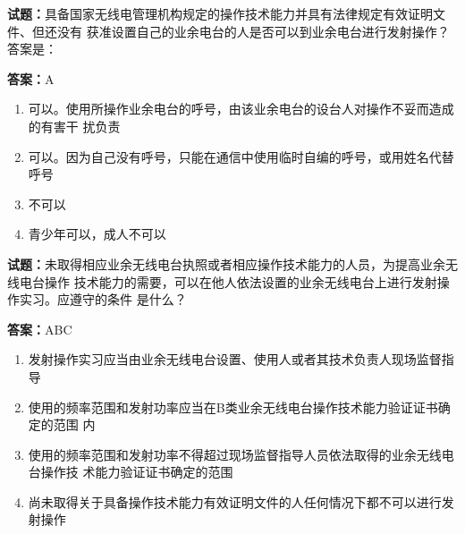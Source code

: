 \documentclass{ctexbook}
\begin{document}




\vspace{1em}

\textbf{试题：}具备国家无线电管理机构规定的操作技术能力并具有法律规定有效证明文件、但还没有
获准设置自己的业余电台的人是否可以到业余电台进行发射操作？答案是： 

\textbf{答案：}A 

\begin{enumerate}[leftmargin=3em]
  \item 可以。使用所操作业余电台的呼号，由该业余电台的设台人对操作不妥而造成的有害干
扰负责 

  \item 可以。因为自己没有呼号，只能在通信中使用临时自编的呼号，或用姓名代替呼号 

  \item 不可以 

  \item 青少年可以，成人不可以 

\end{enumerate}





\vspace{1em}

\textbf{试题：}未取得相应业余无线电台执照或者相应操作技术能力的人员，为提高业余无线电台操作
技术能力的需要，可以在他人依法设置的业余无线电台上进行发射操作实习。应遵守的条件
是什么？ 

\textbf{答案：}ABC 

\begin{enumerate}[leftmargin=3em]
  \item 发射操作实习应当由业余无线电台设置、使用人或者其技术负责人现场监督指导 

  \item 使用的频率范围和发射功率应当在B类业余无线电台操作技术能力验证证书确定的范围
内 


  \item 使用的频率范围和发射功率不得超过现场监督指导人员依法取得的业余无线电台操作技
术能力验证证书确定的范围 

  \item 尚未取得关于具备操作技术能力有效证明文件的人任何情况下都不可以进行发射操作 

\end{enumerate}
\end{document}
